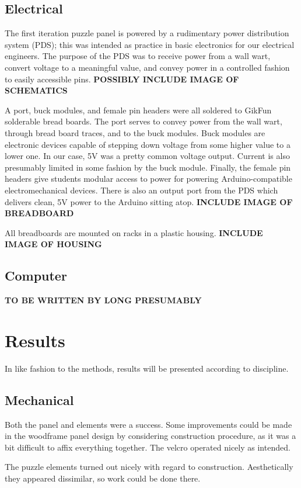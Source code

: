 \documentclass[conference]{IEEEtran}
\begin{document}
	\subsection{Electrical}
	The first iteration puzzle panel is powered by a rudimentary power distribution system (PDS); this was intended as practice in basic electronics for our electrical engineers. The purpose of the PDS was to receive power from a wall wart, convert voltage to a meaningful value, and convey power in a controlled fashion to easily accessible pins.
	\textbf{POSSIBLY INCLUDE IMAGE OF SCHEMATICS}
	
	A port, buck modules, and female pin headers were all soldered to GikFun solderable bread boards. The port serves to convey power from the wall wart, through bread board traces, and to the buck modules. Buck modules are electronic devices capable of stepping down voltage from some higher value to a lower one. In our case, 5V was a pretty common voltage output. Current is also presumably limited in some fashion by the buck module. Finally, the female pin headers give students modular access to power for powering Arduino-compatible electromechanical devices. There is also an output port from the PDS which delivers clean, 5V power to the Arduino sitting atop. 
	\textbf{INCLUDE IMAGE OF BREADBOARD}
	
	All breadboards are mounted on racks in a plastic housing.
	\textbf{INCLUDE IMAGE OF HOUSING}

	\subsection{Computer}
	\textbf{TO BE WRITTEN BY LONG PRESUMABLY}

\section{Results}
In like fashion to the methods, results will be presented according to discipline.
	\subsection{Mechanical}
	Both the panel and elements were a success. Some improvements could be made in the woodframe panel design by considering construction procedure, as it was a bit difficult to affix everything together. The velcro operated nicely as intended.
	
	The puzzle elements turned out nicely with regard to construction. Aesthetically they appeared dissimilar, so work could be done there.
	
\end{document}
